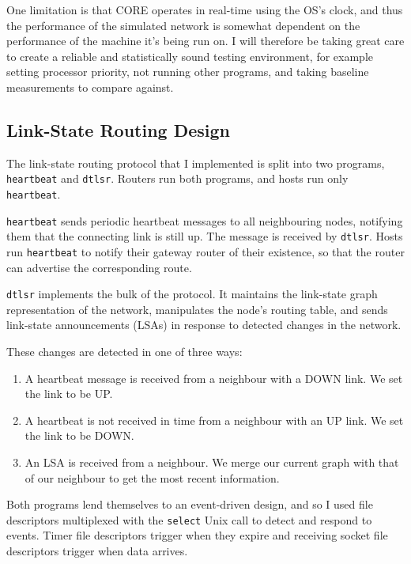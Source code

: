 \documentclass[10pt,twoside,a4paper]{article}
\begin{document}
One limitation is that CORE operates in real-time using the OS's clock, and thus the performance of the simulated network is somewhat dependent on the performance of the machine it's being run on. I will therefore be taking great care to create a reliable and statistically sound testing environment, for example setting processor priority, not running other programs, and taking baseline measurements to compare against.

\subsection{Link-State Routing Design}

The link-state routing protocol that I implemented is split into two programs, \texttt{heartbeat} and \texttt{dtlsr}. Routers run both programs, and hosts run only \texttt{heartbeat}.

\texttt{heartbeat} sends periodic heartbeat messages to all neighbouring nodes, notifying them that the connecting link is still up. The message is received by \texttt{dtlsr}. Hosts run \texttt{heartbeat} to notify their gateway router of their existence, so that the router can advertise the corresponding route.

\texttt{dtlsr} implements the bulk of the protocol. It maintains the link-state graph representation of the network, manipulates the node's routing table, and sends link-state announcements (LSAs) in response to detected changes in the network.

These changes are detected in one of three ways:
\begin{enumerate}
	\item
	A heartbeat message is received from a neighbour with a DOWN link. We set the link to be UP.
	
	\item
	A heartbeat is not received in time from a neighbour with an UP link. We set the link to be DOWN.
	
	\item
	An LSA is received from a neighbour. We merge our current graph with that of our neighbour to get the most recent information.
\end{enumerate}

Both programs lend themselves to an event-driven design, and so I used file descriptors multiplexed with the \texttt{select} Unix call to detect and respond to events. Timer file descriptors trigger when they expire and receiving socket file descriptors trigger when data arrives.
\end{document}
